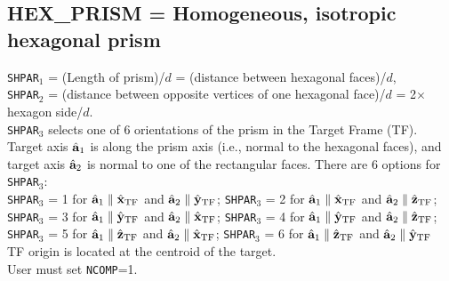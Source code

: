 \subsection{ HEX\_PRISM = Homogeneous, isotropic hexagonal prism
            \label{sec:HEX_PRISM}}
	{\tt SHPAR$_1$} = (Length of prism)/$d$ = (distance between hexagonal
	faces)/$d$,\\
	{\tt SHPAR$_2$} = (distance between opposite vertices of one hexagonal
	face)/$d$ = 2$\times$hexagon side/$d$.\\
	{\tt SHPAR}$_3$ selects one of 6 orientations of the prism in the 
        Target Frame (TF).\\
	Target axis ${\hat{\bf a}}_1$ is along the prism axis (i.e., normal to
	the hexagonal faces), and
	target axis ${\hat{\bf a}}_2$ is normal to one of the rectangular
	faces.  There are 6 options for {\tt SHPAR}$_3$:\\
	{\tt SHPAR}$_3$ = 1 for ${\hat{\bf a}}_1\parallel\hat{\bf x}_{\rm TF}$
         and ${\hat{\bf a}}_2\parallel\hat{\bf y}_{\rm TF}$\quad;\quad
	{\tt SHPAR}$_3$ = 2 for ${\hat{\bf a}}_1\parallel\hat{\bf x}_{\rm TF}$ 
        and ${\hat{\bf a}}_2\parallel\hat{\bf z}_{\rm TF}$\quad;\\
	{\tt SHPAR}$_3$ = 3 for ${\hat{\bf a}}_1\parallel\hat{\bf y}_{\rm TF}$ 
        and ${\hat{\bf a}}_2\parallel\hat{\bf x}_{\rm TF}$\quad;\quad
	{\tt SHPAR}$_3$ = 4 for ${\hat{\bf a}}_1\parallel\hat{\bf y}_{\rm TF}$
        and ${\hat{\bf a}}_2\parallel\hat{\bf z}_{\rm TF}$\quad;\\
	{\tt SHPAR}$_3$ = 5 for ${\hat{\bf a}}_1\parallel\hat{\bf z}_{\rm TF}$
        and ${\hat{\bf a}}_2\parallel\hat{\bf x}_{\rm TF}$\quad;\quad
	{\tt SHPAR}$_3$ = 6 for ${\hat{\bf a}}_1\parallel\hat{\bf z}_{\rm TF}$
        and ${\hat{\bf a}}_2\parallel\hat{\bf y}_{\rm TF}$\\
	TF origin is located at the centroid of the target.\\
	User must set {\tt NCOMP}=1.
